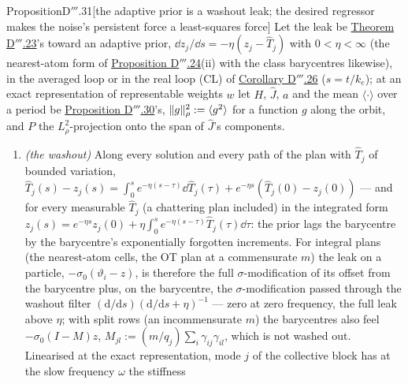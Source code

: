 \begin{thm}{Proposition}{D$'''$.31}[the adaptive prior is a washout leak; the desired regressor makes the noise's
persistent force a least-squares force]\label{res:thmDppp:31}%
Let the leak be \hyperref[res:thmDppp:23]{Theorem D$'''$.23}'s toward an adaptive prior,
$\dd z_j/\dd s = -\eta(z_j - \hat T_j)$ with $0 < \eta < \infty$ (the nearest-atom form of
\hyperref[res:thmDppp:24]{Proposition D$'''$.24}(ii) with the class barycentres likewise), in the averaged loop or in
the real loop \textup{(CL)} of \hyperref[res:thmDppp:26]{Corollary D$'''$.26} ($s = t/k_e$); at an exact
representation of representable weights $w$ let $H$, $\hat J$, $a$ and the mean $\langle\cdot\rangle$ over a period be
\hyperref[res:thmDppp:30]{Proposition D$'''$.30}'s, $\lVert g\rVert^2_\rho := \langle g^2\rangle$ for a function $g$ along the
orbit, and $P$ the $L^2_\rho$-projection onto the span of $\hat J$'s components.
\begin{enumerate}[label=\textup{(\roman*)}]
  \item \emph{(the washout)} Along every solution and every path of the plan with $\hat T_j$ of bounded variation,
    $\hat T_j(s) - z_j(s) = \int_0^se^{-\eta(s-\tau)}\dd\hat T_j(\tau) + e^{-\eta s}(\hat T_j(0) - z_j(0))$ --- and for
    every measurable $\hat T_j$ (a chattering plan included) in the integrated form
    $z_j(s) = e^{-\eta s}z_j(0) + \eta\int_0^se^{-\eta(s-\tau)}\hat T_j(\tau)\dd\tau$: the prior lags the barycentre by
    the barycentre's exponentially forgotten increments. For integral plans (the nearest-atom cells, the OT plan at a
    commensurate $m$) the leak on a particle, $-\sigma_0(\vartheta_i - z)$, is therefore the full
    $\sigma$-modification of its offset from the barycentre plus, on the barycentre, the $\sigma$-modification passed
    through the washout filter $(\mathrm{d}/\mathrm{d}s)(\mathrm{d}/\mathrm{d}s + \eta)^{-1}$ --- zero at zero
    frequency, the full leak above $\eta$; with split rows (an incommensurate $m$) the barycentres also feel
    $-\sigma_0(I - M)z$, $M_{jl} := (m/q_j)\sum_i\gamma_{ij}\gamma_{il}$, which is not washed out. Linearised at the
    exact representation, mode $j$ of the collective block has at the slow frequency $\omega$ the stiffness

\end{enumerate}
\end{thm}

